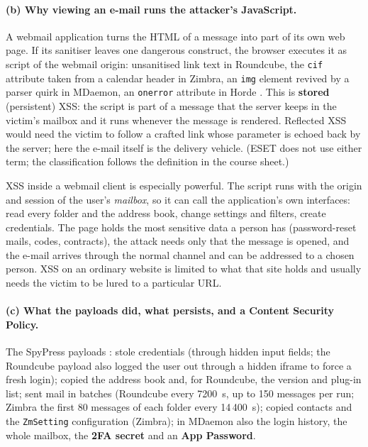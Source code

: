 \documentclass[11pt,a4paper]{article}
\newcommand{\code}[1]{\texttt{#1}}
\begin{document}
\paragraph{(b) Why viewing an e-mail runs the attacker's JavaScript.} A webmail application turns the HTML of a message
into part of its own web page. If its sanitiser leaves one dangerous construct, the browser executes it as script of
the webmail origin: unsanitised link text in Roundcube, the \code{cif} attribute taken from a calendar header in Zimbra,
an \code{img} element revived by a parser quirk in MDaemon, an \code{onerror} attribute in Horde \cite{eset}. This is
\textbf{stored} (persistent) XSS: the script is part of a message that the server keeps in the victim's mailbox and it
runs whenever the message is rendered. Reflected XSS would need the victim to follow a crafted link whose parameter is
echoed back by the server; here the e-mail itself is the delivery vehicle. (ESET does not use either term; the
classification follows the definition in the course sheet.)

XSS inside a webmail client is especially powerful. The script runs with the origin and session of the user's
\emph{mailbox}, so it can call the application's own interfaces: read every folder and the address book, change
settings and filters, create credentials. The page holds the most sensitive data a person has (password-reset mails,
codes, contracts), the attack needs only that the message is opened, and the e-mail arrives through the normal channel
and can be addressed to a chosen person. XSS on an ordinary website is limited to what that site holds and usually needs
the victim to be lured to a particular URL.

\paragraph{(c) What the payloads did, what persists, and a Content Security Policy.} The SpyPress payloads
\cite{eset}: stole credentials (through hidden input fields; the Roundcube payload also logged the user out through a
hidden iframe to force a fresh login); copied the address book and, for Roundcube, the version and plug-in list; sent
mail in batches (Roundcube every 7200~s, up to 150 messages per run; Zimbra the first 80 messages of each folder every
14\,400~s); copied contacts and the \code{ZmSetting} configuration (Zimbra); in MDaemon also the login history, the whole mailbox,
the \textbf{2FA secret} and an \textbf{App Password}.
\end{document}
